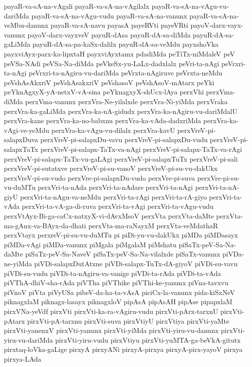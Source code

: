 {payaR-va-sA-na-vAgali
payaR-va-sA-na-vAgilalx
payaR-va-sA-na-vAgu-vu-dariMda
payaR-va-sA-na-vAgu-vudu
payaR-va-sA-na-vanunx
payaR-va-sA-na-veMbu-danunx
payaR-va-sA-navu
payasA
payeRVti
payeVRti
payoV-darx-vayx-vanunx
payoV-darx-vayxveV
payuR-dAsa
payuR-dA-sa-diMda
payuR-dA-sa-gaLiMda
payuR-dA-sa-pa-kaSx-dalilx
payuR-dA-sa-veMdu
payxshoVka
payxviAyx-parx-ka-lipxtaH
payxviAyxtamx
pdadiMda
peTiTx-niMdaleV
peV
peVSa-NAdi
peVSa-Na-diMda
peVkeSx-yu-LaLx-dadxlalx
peVri-ta-nAgi
peVrxri-ta-nAgi
peVrxri-ta-nAgiru-vu-dariMda
peVrxta-nAgiruve
peVrxta-neMdu
peVshAsAkxriV
peVshAsakxriV
peVshasoV
peVshAsoV-mAtarx
peYki
peYknAgxyX-yA-netxV-vA-sina
peYknagxyX-shUcx-lAya
perxVhi
perxVma-diMda
perxVma-vanunx
perxVra-Ne-yilalxde
perxVra-Ni-yiMda
perxVraka
perxVra-ka-gaLiMda
perxVra-ka-nA-gidudx
perxVra-ka-nAgiru-vu-dariMdalU
perxVra-kane
perxVra-ka-no-babxnu
perxVra-ka-vAda-dadxriMda
perxVra-ka-vAgi-ve-yeMdu
perxVra-ka-vAgu-vu-dilalx
perxVra-kavU
perxVreV-pi-salapxDuva
perxVreV-pi-salapxDu-vavu
perxVreV-pi-salapxDu-vudu
perxVreV-pi-salapxTaTx
perxVreV-pi-salapx-TaTx-va-nAgi
perxVreV-pi-salapx-TaTx-va-rAgi
perxVreV-pi-salapx-TaTx-vu-gaLAgi
perxVreV-pi-salapxTuTx
perxVreV-pi-sali
perxVreV-pi-sutatxve
perxVreV-pi-su-vanoV
perxVreV-pi-su-vu-dakUkx
perxVreV-pi-su-vudo
perxVre-pi-salapxDu-vudo
perxVre-pi-suva
perxVre-pi-su-vu-duMTu
perxVri-ta-nAda
perxVri-ta-nAdare
perxVri-ta-nAgi
perxVri-ta-nA-giyU
perxVri-ta-nAgu-va-neMdu
perxVri-ta-rAgi
perxVri-ta-rA-giyo
perxVri-ta-vAda
perxVri-ta-vA-ga-di-ruva
perxVri-ta-vAgi
perxVri-ta-vAgu-vudu
perxVtAyx-Bi-ga-caCx-natxyX-vi-dAvxMsoV
perxVta
perxVta-daMte
perxVta-ma-gAnx-va-BAyx-da-dhati
perxVta-ma-raNayxM
perxVta-veMdathaR
perxVtayx
perxreV-pi-su-vu-duMTu
pi
piDi-yu-vu-dakUkx
piMDa
piMDasayx
piMDa-vAgi
piMDa-vanunx
piMgala
piMgalaM
piMshatu
piSaTx-peV-Sa-Na-daMte
piSaTx-peV-Sa-NaveV
piSaTx-peV-Sa-Na-vilalxde
piSaTx-vanunx
piVDa-ne-yiMda
piVDi-salapxDutAtxne
piVDi-salapx-TuTx-dA-giyoV
piVDi-su-vavu
piVDi-su-vudu
piVDi-ta-nAgiru-va-vanige
piVDi-ta-rAda
piVDi-ta-vAda
piVThA-dhiV-sha-rAda
piVTha
piVThike
piVThi-ke-yanunx
piVna-tavxvu
piVnoV
piVta
piVyUSa
pibeV-da-ha-ta-vAsA
piciCx-la-vanunx
pida-kiSxNeV
piknagxlaM
piknagx-lasayx
piknagxloV
pipAsA
pipAsAH
pipAse
pipapxlaM
pirxVNa-yeVdf
pirxVti
pirxVti-ka-ra-vAgiru-vudu
pirxVti-pArx-tarxnU
pirxVti-pAtarx
pirxVti-pA-tarxnu
pirxVti-suva
pirxVtiyU
pirxVtiya
pirxVti-yaMte
pirxVti-yanenxV
pirxVti-yanunx
pirxVti-yiMda
pirxVti-yiru-vu-danunx
pirxVti-yiru-vu-dariMda
pirxVti-yiru-vudu
pirxVtiyu
pirxVti-yuMTA-ga-beVkA-gitutx
pirxtaq-loVka-gaLige
pirxyA
pirxyANi
pirxyA-pirxya
pirxyA-pirx-yayoV
pirxya
pirxya-LAda
}

